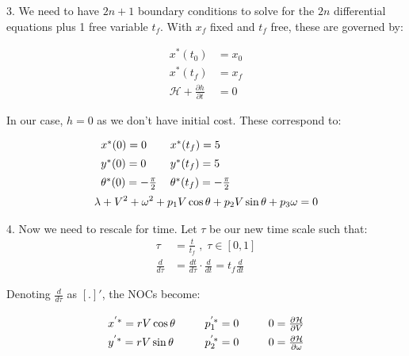 \documentclass{article}
\begin{document}
\begin{enumerate}[label=(\roman*)]
	\pagebreak
	
	3. We need to have $2n+1$ boundary conditions to solve for the $2n$ differential equations plus 1 free variable $t_f$. With $x_f$ fixed and $t_f$ free, these are governed by:
	
	\begin{equation}
	\begin{aligned}
	x^*(t_0) &= x_0 \\
	x^*(t_f) &= x_f \\
	\mathcal{H} + \frac{\partial h}{\partial t} &= 0
	\end{aligned}
	\end{equation}
	
	In our case, $h=0$ as we don't have initial cost. These correspond to:
	\begin{equation}
	\begin{aligned}
	&{\renewcommand{\arraystretch}{1.4}
	\begin{tabular}[c]{l l l}
	$x^*(0) = 0$ & $x^*(t_f) = 5$ \\
	$y^*(0) = 0$ & $y^*(t_f) = 5$ \\
	$\theta^*(0) = -\frac{\pi}{2}$ & $\theta^*(t_f) = -\frac{\pi}{2}$ \\
	\end{tabular}} \\
	&\lambda + V^2 + \omega^2 + p_1 V\cos\theta + p_2 V\sin\theta + p_3 \omega = 0
	\end{aligned}
	\end{equation}
	
	4. Now we need to rescale for time. Let $\tau$ be our new time scale such that:
	\begin{equation}
	\begin{aligned}
	\tau &= \frac{t}{t_f} \;,\; \tau \in [0,1] \\
	\frac{d}{d\tau} &= \frac{dt}{d\tau} \cdot \frac{d}{dt}   = t_f \frac{d}{dt}
	\end{aligned}
	\end{equation}
	
	Denoting $\frac{d}{d\tau}$ as $[.]'$, the NOCs become:
	
	\begin{equation}
	{\renewcommand{\arraystretch}{1.4}
	\begin{tabular}[c]{l l l l l}
	$x^{'*} = rV \cos\theta$ 	&\;&
	$p_1^{'*} = 0$	&\;&
	$0 = \frac{\partial\mathcal{H}}{\partial V}$ \\
	
	$y^{'*} = rV \sin\theta$ 	&\;&
	$p_2^{'*} = 0$	&\;&
	$0 = \frac{\partial\mathcal{H}}{\partial \omega}$ \\
	

\end{tabular}}
\end{equation}
\end{enumerate}
\end{document}

